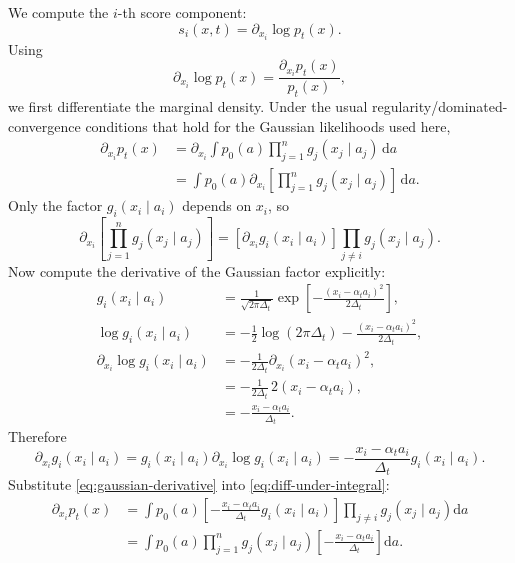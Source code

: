 \documentclass[11pt]{article}
\begin{document}
We compute the \(i\)-th score component:
\begin{equation}
  s_i(x,t)=\partial_{x_i}\log p_t(x).
\end{equation}
Using
\begin{equation}
  \partial_{x_i}\log p_t(x)=\frac{\partial_{x_i}p_t(x)}{p_t(x)},
  \label{eq:log-derivative}
\end{equation}
we first differentiate the marginal density. Under the usual regularity/dominated-convergence conditions that hold for the Gaussian likelihoods used here,
\begin{align}
  \partial_{x_i}p_t(x)
  &= \partial_{x_i}\int p_0(a)\prod_{j=1}^n g_j(x_j\mid a_j)\,\mathrm{d}a \\
  &= \int p_0(a)\partial_{x_i}\left[\prod_{j=1}^n g_j(x_j\mid a_j)\right]\,\mathrm{d}a.
  \label{eq:diff-under-integral}
\end{align}
Only the factor \(g_i(x_i\mid a_i)\) depends on \(x_i\), so
\begin{equation}
  \partial_{x_i}\left[\prod_{j=1}^n g_j(x_j\mid a_j)\right]
  =
  \left[\partial_{x_i}g_i(x_i\mid a_i)\right]
  \prod_{j\ne i}g_j(x_j\mid a_j).
\end{equation}
Now compute the derivative of the Gaussian factor explicitly:
\begin{align}
  g_i(x_i\mid a_i)
  &= \frac{1}{\sqrt{2\pi\Delta_t}}
  \exp\left[-\frac{(x_i-\alpha_t a_i)^2}{2\Delta_t}\right],\\
  \log g_i(x_i\mid a_i)
  &= -\frac12\log(2\pi\Delta_t)
  -\frac{(x_i-\alpha_t a_i)^2}{2\Delta_t},\\
  \partial_{x_i}\log g_i(x_i\mid a_i)
  &= -\frac{1}{2\Delta_t}\partial_{x_i}(x_i-\alpha_t a_i)^2,\\
  &= -\frac{1}{2\Delta_t}\,2(x_i-\alpha_t a_i),\\
  &= -\frac{x_i-\alpha_t a_i}{\Delta_t}.
\end{align}
Therefore
\begin{equation}
  \partial_{x_i}g_i(x_i\mid a_i)
  = g_i(x_i\mid a_i)\partial_{x_i}\log g_i(x_i\mid a_i)
  = -\frac{x_i-\alpha_t a_i}{\Delta_t}g_i(x_i\mid a_i).
  \label{eq:gaussian-derivative}
\end{equation}
Substitute \eqref{eq:gaussian-derivative} into \eqref{eq:diff-under-integral}:
\begin{align}
  \partial_{x_i}p_t(x)
  &= \int p_0(a)
  \left[-\frac{x_i-\alpha_t a_i}{\Delta_t}g_i(x_i\mid a_i)\right]
  \prod_{j\ne i}g_j(x_j\mid a_j)
  \mathrm{d}a \\
  &= \int p_0(a)
  \prod_{j=1}^n g_j(x_j\mid a_j)
  \left[-\frac{x_i-\alpha_t a_i}{\Delta_t}\right]
  \mathrm{d}a.
  \label{eq:partial-marginal}
\end{align}
\end{document}

